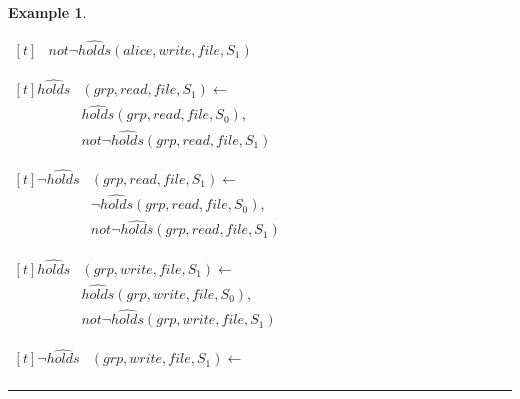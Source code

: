 \documentclass[10pt, twocolumn]{article}
\newtheorem{examp}{Example}
\newenvironment{example}{\begin{examp}\rm}{\rule{2mm}{2mm}\end{examp}}
\begin{document}
\begin{example}
\begin{list}{}{Inertial Rules}
\begin{math}
\begin{aligned}[t]
                    & not \lnot \hat{holds}(alice, write, file, S_{1})
                  \end{aligned}
              \end{math}
            \item
              \begin{math}
                  \begin{aligned}[t]
                    \hat{holds}&(grp, read, file, S_{1}) \leftarrow \\
                    & \hat{holds}(grp, read, file, S_{0}), \\
                    & not \lnot \hat{holds}(grp, read, file, S_{1})
                  \end{aligned}
              \end{math}
            \item
              \begin{math}
                  \begin{aligned}[t]
                    \lnot \hat{holds}&(grp, read, file, S_{1}) \leftarrow \\
                    & \lnot \hat{holds}(grp, read, file, S_{0}), \\
                    & not \lnot \hat{holds}(grp, read, file, S_{1})
                  \end{aligned}
              \end{math}
            \item
              \begin{math}
                  \begin{aligned}[t]
                    \hat{holds}&(grp, write, file, S_{1}) \leftarrow \\
                    & \hat{holds}(grp, write, file, S_{0}), \\
                    & not \lnot \hat{holds}(grp, write, file, S_{1})
                  \end{aligned}
              \end{math}
            \item
              \begin{math}
                  \begin{aligned}[t]
                    \lnot \hat{holds}&(grp, write, file, S_{1}) \leftarrow \\

\end{aligned}
\end{math}
\end{list}
\end{example}
\end{document}
